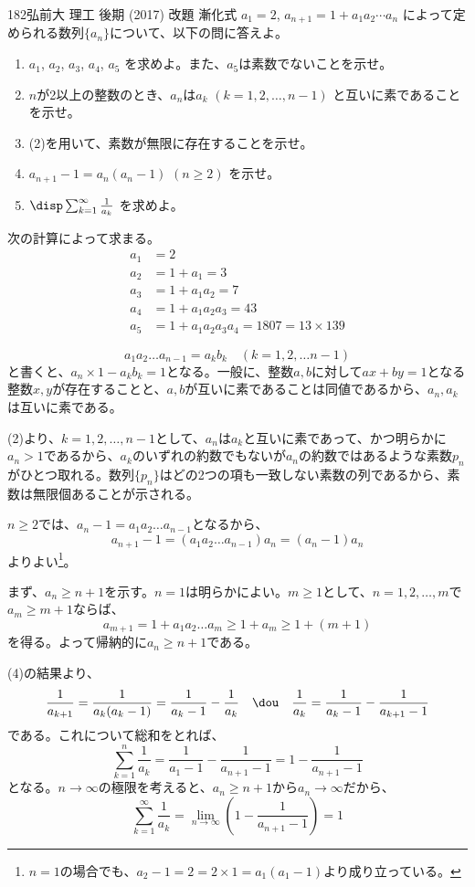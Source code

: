 \begin{thm}{182}{}{弘前大 理工 後期 (2017) 改題}
 漸化式 $a_1=2$, $a_{n+1}=1+a_1a_2\cdots a_n$ によって定められる数列$\{a_n\}$について、以下の問に答えよ。
 \begin{enumerate}
  \item $a_1$, $a_2$, $a_3$, $a_4$, $a_5$ を求めよ。また、$a_5$は素数でないことを示せ。
  \item $n$が2以上の整数のとき、$a_n$は$a_k$ $(k=1, 2, \dots, n-1)$ と互いに素であることを示せ。
  \item (2)を用いて、素数が無限に存在することを示せ。
  \item $a_{n+1}-1=a_n(a_n-1)$ $(n\ge 2)$ を示せ。
  \item $\disp \sum_{k=1}^\infty \frac{1}{a_k}$ を求めよ。
 \end{enumerate}
\end{thm}

次の計算によって求まる。
\begin{align*}
 a_1&=2 \\
 a_2&=1+a_1=3 \\
 a_3&=1+a_1a_2=7 \\
 a_4&=1+a_1a_2a_3=43 \\
 a_5&=1+a_1a_2a_3a_4=1807=13\times 139
\end{align*}

\[ a_1a_2\dots a_{n-1}=a_kb_k \quad (k=1, 2, \dots n-1) \]
と書くと、$a_n\times 1-a_kb_k=1$となる。一般に、整数$a, b$に対して$ax+by=1$となる整数$x, y$が存在することと、$a, b$が互いに素であることは同値であるから、$a_n, a_k$は互いに素である。

(2)より、$k=1, 2, \dots, n-1$として、$a_n$は$a_k$と互いに素であって、かつ明らかに$a_n>1$であるから、$a_k$のいずれの約数でもないが$a_n$の約数ではあるような素数$p_n$がひとつ取れる。数列$\{p_n\}$はどの2つの項も一致しない素数の列であるから、素数は無限個あることが示される。

$n\ge 2$では、$a_n-1=a_1a_2\dots a_{n-1}$となるから、
\[ a_{n+1}-1=(a_1a_2\dots a_{n-1})a_n=(a_n-1)a_n \]
よりよい\footnote{$n=1$の場合でも、$a_2-1=2=2\times 1=a_1(a_1-1)$より成り立っている。}。

まず、$a_n\ge n+1$を示す。$n=1$は明らかによい。$m\ge 1$として、$n=1, 2, \dots, m$で$a_m\ge m+1$ならば、
\[ a_{m+1}=1+a_1a_2\dots a_m \ge 1+a_m \ge 1+(m+1) \]
を得る。よって帰納的に$a_n\ge n+1$である。

(4)の結果より、
\[ \frac{1}{a_{k+1}}=\frac{1}{a_k(a_k-1)}=\frac{1}{a_k-1}-\frac{1}{a_k} \quad\dou\quad \frac{1}{a_k}=\frac{1}{a_k-1}-\frac{1}{a_{k+1}-1} \]
である。これについて総和をとれば、
\[ \sum_{k=1}^n\frac{1}{a_k}=\frac{1}{a_1-1}-\frac{1}{a_{n+1}-1}=1-\frac{1}{a_{n+1}-1} \]
となる。$n\to\infty$の極限を考えると、$a_n\ge n+1$から$a_n\to\infty$だから、
\[ \sum_{k=1}^\infty\frac{1}{a_k}=\lim_{n\to\infty}\left(1-\frac{1}{a_{n+1}-1}\right)=1 \]